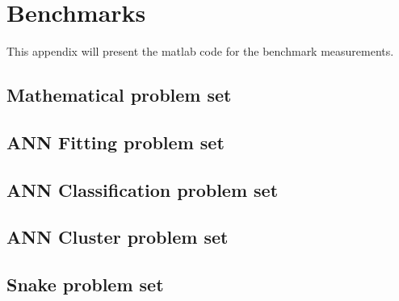 \section{Benchmarks}

This appendix will present the matlab code for the benchmark measurements.

\subsection{Mathematical problem set}



\subsection{ANN Fitting problem set}



\subsection{ANN Classification problem set}



\subsection{ANN Cluster problem set}



\subsection{Snake problem set}


